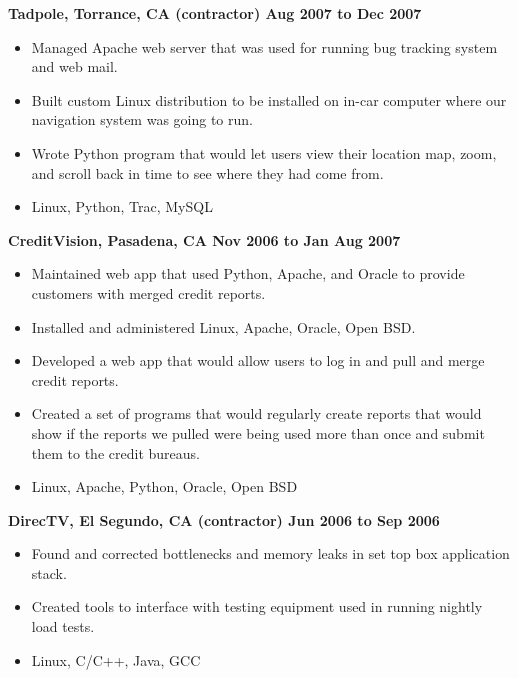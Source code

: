 \documentclass{res}
\begin{document}
\begin{resume}
{\large \bf Tadpole, Torrance, CA (contractor) \hfill Aug 2007 to Dec 2007}
\begin{itemize}

\item Managed Apache web server that was used for running bug
tracking system and web mail.

\item Built custom Linux distribution to be installed on in-car
computer where our navigation system was going to run.

\item Wrote Python program that would let users view their location
map, zoom, and scroll back in time to see where they had come from.

\item Linux, Python, Trac, MySQL

\end{itemize}

{\large \bf CreditVision, Pasadena, CA \hfill Nov 2006 to Jan Aug 2007}
\begin{itemize}
\item Maintained web app that used Python, Apache, and Oracle to
provide customers with merged credit reports.
\item Installed and administered Linux, Apache, Oracle, Open BSD.
\item Developed a web app that would allow users to log in and
pull and merge credit reports.
\item Created a set of programs that would regularly create reports
that would show if the reports we pulled were being used more than
once and submit them to the credit bureaus.
\item  Linux, Apache, Python, Oracle, Open BSD
\end{itemize}

{\large \bf DirecTV, El Segundo, CA (contractor) \hfill Jun 2006 to Sep 2006}

\begin{itemize}

\item Found and corrected bottlenecks and memory leaks in set top
box application stack.

\item Created tools to interface with testing equipment used in
running nightly load tests.

\item Linux, C/C++, Java, GCC
\end{itemize}


\end{resume}
\end{document}
